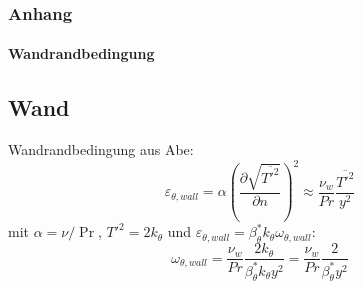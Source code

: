 \documentclass[10pt,xcolor=dvipsnames]{beamer}
\begin{document}
\begin{frame}
    \frametitle{Anhang}
    \framesubtitle{Wandrandbedingung}
    \subsection{Wand}
    Wandrandbedingung aus Abe:
    \begin{equation}
        \varepsilon_{\theta,wall} = 
        \alpha \left( \frac{\partial \sqrt{\overline{T'^2}}}{ \partial n} \right)^2
        \approx \frac{\nu_w}{Pr} \frac{\overline{T'^2}}{y^2}
    \end{equation}
    mit $\alpha = \nu/\Pr$, $T'^2 = 2k_{\theta}$ und $\varepsilon_{\theta,wall}=\beta_\theta^* k_{\theta} \omega_{\theta,wall} $:
    \begin{equation}
        \omega_{\theta,wall} 
        = \frac{\nu_w}{Pr} \frac{2 k_{\theta}}{\beta_\theta^* k_{\theta} y^2}
        = \frac{\nu_w}{Pr} \frac{2 }{\beta_\theta^* y^2}
    \end{equation}
\end{frame}
\end{document}
